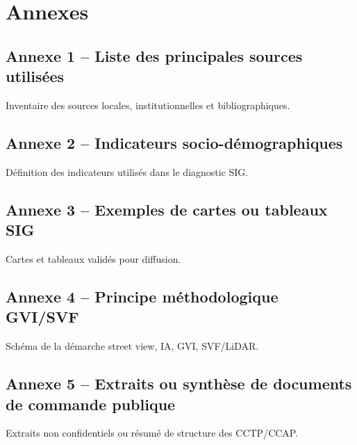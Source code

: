 \documentclass[11pt,a4paper]{article}
\begin{document}
\section{Annexes}

\subsection{Annexe 1 -- Liste des principales sources utilisées}
Inventaire des sources locales, institutionnelles et bibliographiques.

\subsection{Annexe 2 -- Indicateurs socio-démographiques}
Définition des indicateurs utilisés dans le diagnostic SIG.

\subsection{Annexe 3 -- Exemples de cartes ou tableaux SIG}
Cartes et tableaux validés pour diffusion.

\subsection{Annexe 4 -- Principe méthodologique GVI/SVF}
Schéma de la démarche street view, IA, GVI, SVF/LiDAR.

\subsection{Annexe 5 -- Extraits ou synthèse de documents de commande publique}
Extraits non confidentiels ou résumé de structure des CCTP/CCAP.
\end{document}

